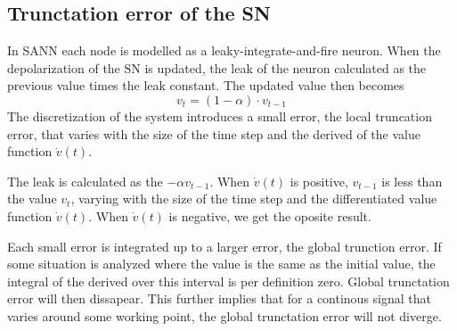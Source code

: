 



	\subsection{Trunctation error of the SN} %
	\label{ssecTruncationErrorOfSN}
In SANN each node is modelled as a leaky-integrate-and-fire neuron.
When the depolarization of the SN is updated, the leak of the neuron calculated as the previous value times the leak constant.
The updated value then becomes %
\begin{equation} %
	v_t =  (1-\alpha) \cdot v_{t-1}  
\end{equation}
The discretization of the system introduces a small error, the local truncation error, that varies with the size of the time step and the derived of the value function $\dot{v}(t)$. %

The leak is calculated as the $-\alpha v_{t-1}$.
When $\dot{v}(t)$ is positive, $v_{t-1}$ is less than the value $v_t$, varying with the size of the time step and the differentiated value function $\dot{v}(t)$.
When $\dot{v}(t)$ is negative, we get the oposite result.

Each small error is integrated up to a larger error, the global trunction error. 
If some situation is analyzed where the value is the same as the initial value, the integral of the derived over this interval is per definition zero.
Global trunctation error will then dissapear. 
This further implies that for a continous signal that varies around some working point, the global trunctation error will not diverge.  %

